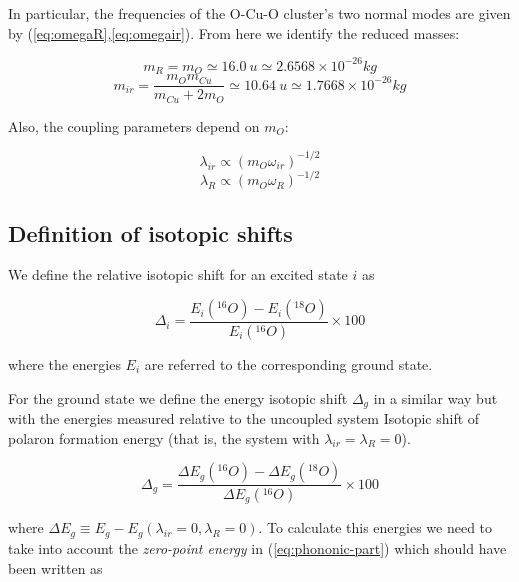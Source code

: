 In particular, the frequencies of the O-Cu-O cluster's two normal modes are given by (\ref{eq:omegaR},\ref{eq:omegair}). 
From here we identify the reduced masses:

\begin{equation}\label{eq:redMassR}
m_R = m_O \simeq 16.0\ u \simeq 2.6568 \times 10^{-26} kg
\end{equation}
\begin{equation}\label{eq:redMassIr}
m_{ir}=\frac{m_Om_{Cu}}{m_{Cu}+2m_O} \simeq 10.64\ u \simeq 1.7668 \times 10^{-26}kg
\end{equation}


Also, the coupling parameters depend on $m_O$\cite{?}:

\begin{equation}\label{eq:ir-coupl-isot}
\lambda_{ir}\propto (m_O\omega_{ir})^{-1/2}
\end{equation}
\begin{equation}\label{eq:Ram-coupl-isot}
\lambda_R\propto (m_O\omega_{R})^{-1/2}
\end{equation}

\subsection{Definition of isotopic shifts}

We define the relative isotopic shift for an excited state $i$ as 

\begin{equation}\label{eq:isot-shift-def-exc}
\Delta_i = \frac{E_i(^{16}O)- E_i(^{18}O)}{E_i(^{16}O)} \times 100
\end{equation}

where the energies $E_i$ are referred to the corresponding ground state.

For the ground state we define the energy isotopic shift $\Delta_g$ in a similar way but with the energies measured relative to the uncoupled system Isotopic shift of polaron formation energy (that is, the system with $\lambda_{ir}=\lambda_R=0$).

\begin{equation}\label{eq:isot-shift-def-grd}
\Delta_g = \frac{\Delta E_g(^{16}O)- \Delta E_g(^{18}O)}{\Delta E_g(^{16}O)} \times 100
\end{equation}

where $\Delta E_g \equiv E_g - E_g(\lambda_{ir}=0, \lambda_R=0)$. To calculate this energies we need to take into account the \textit{zero-point energy} in (\ref{eq:phononic-part}) which should have been written as 

